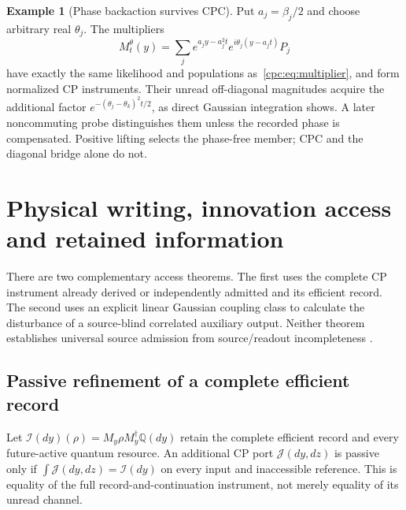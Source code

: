\documentclass[11pt,oneside,openany]{book}
\theoremstyle{definition}
\newtheorem{example}[theorem]{Example}
\theoremstyle{remark}\newtheorem{remark}[theorem]{Remark}
\begin{document}
\begin{example}[Phase backaction survives CPC]
Put $a_j=\beta_j/2$ and choose arbitrary real $\theta_j$. The multipliers
\begin{equation}
 M_t^\theta(y)=\sum_j e^{a_jy-a_j^2t}
 e^{i\theta_j(y-a_jt)}P_j
 \label{cpc:eq:phasefamily}
\end{equation}
have exactly the same likelihood and populations as~\eqref{cpc:eq:multiplier}, and form normalized CP instruments. Their unread off-diagonal magnitudes acquire the additional factor
$e^{-(\theta_j-\theta_k)^2t/2}$, as direct Gaussian integration shows. A later noncommuting probe distinguishes them unless the recorded phase is compensated. Positive lifting selects the phase-free member; CPC and the diagonal bridge alone do not.
\end{example}

\chapter{Physical writing, innovation access and retained information}
\label{cpc:chap:access}

There are two complementary access theorems. The first uses the complete CP instrument already derived or independently admitted and its efficient record. The second uses an explicit linear Gaussian coupling class to calculate the disturbance of a source-blind correlated auxiliary output. Neither theorem establishes universal source admission from source/readout incompleteness \cite{M08,M09,M13}.

\section{Passive refinement of a complete efficient record}

Let $\mathcal I(dy)(\rho)=M_y\rho M_y^\dagger\mathbb Q(dy)$ retain the complete efficient record and every future-active quantum resource. An additional CP port $\mathcal J(dy,dz)$ is passive only if
$\int\mathcal J(dy,dz)=\mathcal I(dy)$
on every input and inaccessible reference. This is equality of the full record-and-continuation instrument, not merely equality of its unread channel.
\end{document}
